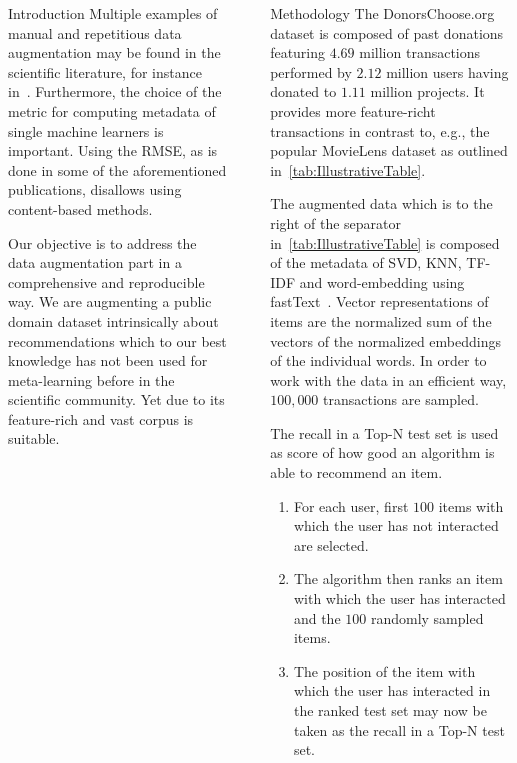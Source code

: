 \documentclass[final]{beamer}
\newcommand{\parvspace}[1]{\vspace{.5em}}  %
\begin{document}
\begin{frame}[t,fragile=singleslide]{}
\begin{columns}[t]
\begin{column}{0.45\textwidth}
\begin{block}{Introduction}
				Multiple examples of manual and repetitious data augmentation may be found in the scientific literature, for instance in~\cite{CUNHA2018128,DBLP:journals/corr/abs-1805-12118,Ekstrand:2012:RFP:2365952.2366002}. Furthermore, the choice of the metric for computing metadata of single machine learners is important. Using the RMSE, as is done in some of the aforementioned publications, disallows using content-based methods.
				\parvspace{}

				Our objective is to address the data augmentation part in a comprehensive and reproducible~\cite{UMUAI:TowardsReproducibilityInRecSysBeel2016} way. We are augmenting a public domain dataset intrinsically about recommendations which to our best knowledge has not been used for meta-learning before in the scientific community. Yet due to its feature-rich and vast corpus is suitable.
			\end{block}
		\end{column}

		{
			\color{gray}
			\hspace{-1em}
			\vrule{}
			\hspace{+1em}
		}

		\begin{column}{0.45\textwidth}
			\begin{block}{Methodology}
				The DonorsChoose.org dataset is composed of past donations featuring $4.69$ million transactions performed by $2.12$ million users having donated to $1.11$ million projects. It provides more feature-richt transactions in contrast to, e.g., the popular MovieLens dataset as outlined in~\autoref{tab:IllustrativeTable}.
				\parvspace{}

				The augmented data which is to the right of the separator in~\autoref{tab:IllustrativeTable} is composed of the metadata of SVD, KNN, TF-IDF and word-embedding using fastText~\cite{scikit-learn,rehurek_lrec,DBLP:journals/corr/BojanowskiGJM16}. Vector representations of items are the normalized sum of the vectors of the normalized embeddings of the individual words. In order to work with the data in an efficient way, $100,000$ transactions are sampled.
				\parvspace{}

				The recall in a Top-N test set is used as score of how good an algorithm is able to recommend an item.
				\begin{enumerate}
					\item For each user, first $100$ items with which the user has not interacted are selected.
					\item The algorithm then ranks an item with which the user has interacted and the $100$ randomly sampled items.
					\item The position of the item with which the user has interacted in the ranked test set may now be taken as the recall in a Top-N test set.
				\end{enumerate}
			\end{block}
		\end{column}
	\end{columns}


\end{frame}
\end{document}
